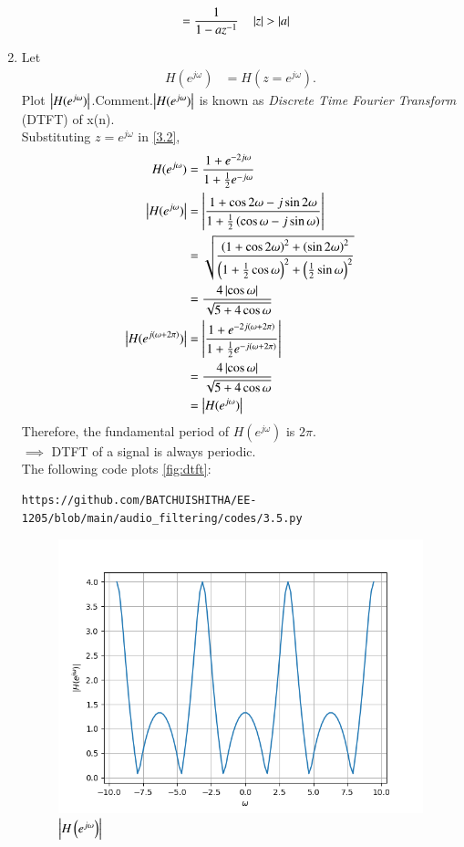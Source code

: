 \documentclass[journal,12pt,twocolumn]{IEEEtran}
\theoremstyle{remark}
\begin{document}
\begin{enumerate}[label=\thesection.\arabic*]
\begin{align}
			&= \frac{1}{1-az^{-1}} \quad \left\vert z\right\vert > \left\vert a\right\vert \label{3.4}
\end{align}
\item Let
\begin{align}
H(e^{j\omega})&=H(z=e^{j\omega}).
\end{align}
Plot $\left\vert H(e^{j\omega})\right\vert$.Comment.$\left\vert H(e^{j\omega})\right\vert$ is known as \textit{Discrete Time Fourier Transform} (DTFT) of x(n).\\
\solution
Substituting $z=e^{j\omega}$ in \eqref{3.2},
\begin{align}
H(e^{j\omega})&=\frac{1+e^{-2j\omega}}{1+\frac{1}{2}e^{-j\omega}} \\
\left\vert H(e^{j\omega})\right\vert &= \left\vert\frac{1+\cos2\omega -j\sin 2\omega }{1+\frac{1}{2}\left(\cos\omega-j\sin\omega\right)}\right\vert \\
&= \sqrt{\frac{\left(1+\cos2\omega\right)^2+\left(\sin 2\omega\right)^2}{\left(1+\frac{1}{2}\cos\omega\right)^2+\left(\frac{1}{2}\sin\omega\right)^2}}\\
&= \frac{4\left\vert\cos\omega\right\vert}{\sqrt{5+4\cos\omega}}\\
\left\vert H(e^{j(\omega+2\pi)})\right\vert&=\left\vert\frac{1+e^{-2j(\omega+2\pi)}}{1+\frac{1}{2}e^{-j(\omega+2\pi)}}\right\vert \\
&= \frac{4\left\vert\cos\omega\right\vert}{\sqrt{5+4\cos\omega}} \\
&= \left\vert H(e^{j\omega})\right\vert 
\end{align}
Therefore, the fundamental period of $H(e^{j\omega})$ is $2\pi$.\\
$\implies$ DTFT of a signal is always periodic.\\ 
The following code plots \eqref{fig:dtft}:
\begin{lstlisting}
https://github.com/BATCHUISHITHA/EE-1205/blob/main/audio_filtering/codes/3.5.py
\end{lstlisting}
\begin{figure}[ht]
	\centering
	\includegraphics[width=\columnwidth]{figs/3.4.png}
	\caption{$\left\vert H\left(e^{j\omega}\right)\right\vert$}
	\label{fig:dtft}
\end{figure}
\end{enumerate}
\end{document}
